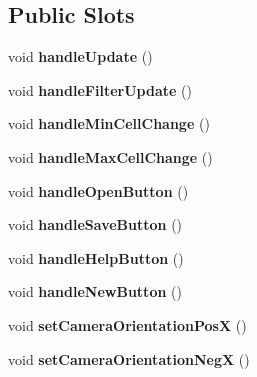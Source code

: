 \subsection*{Public Slots}
\begin{DoxyCompactItemize}
\item 
void {\bfseries handle\+Update} ()\hypertarget{class_main_window_a5c6cea005b60afcc4e0555e40e280e1d}{}\label{class_main_window_a5c6cea005b60afcc4e0555e40e280e1d}

\item 
void {\bfseries handle\+Filter\+Update} ()\hypertarget{class_main_window_a299cb4a0a6e55de646b6439e4c296174}{}\label{class_main_window_a299cb4a0a6e55de646b6439e4c296174}

\item 
void {\bfseries handle\+Min\+Cell\+Change} ()\hypertarget{class_main_window_a5377594fb7fa7112399225602bd7d116}{}\label{class_main_window_a5377594fb7fa7112399225602bd7d116}

\item 
void {\bfseries handle\+Max\+Cell\+Change} ()\hypertarget{class_main_window_a118309e7783cfc818bd93c883f4e8e89}{}\label{class_main_window_a118309e7783cfc818bd93c883f4e8e89}

\item 
void {\bfseries handle\+Open\+Button} ()\hypertarget{class_main_window_a16434089bdb53bc4c867c558c0a7fbb4}{}\label{class_main_window_a16434089bdb53bc4c867c558c0a7fbb4}

\item 
void {\bfseries handle\+Save\+Button} ()\hypertarget{class_main_window_ac52b63ed01bbdd8fd4425be619927c8a}{}\label{class_main_window_ac52b63ed01bbdd8fd4425be619927c8a}

\item 
void {\bfseries handle\+Help\+Button} ()\hypertarget{class_main_window_a919e75cfef556ae0b5611d6655734d1a}{}\label{class_main_window_a919e75cfef556ae0b5611d6655734d1a}

\item 
void {\bfseries handle\+New\+Button} ()\hypertarget{class_main_window_ab015df9a44e44eed7dfb685bd2c38295}{}\label{class_main_window_ab015df9a44e44eed7dfb685bd2c38295}

\item 
void {\bfseries set\+Camera\+Orientation\+PosX} ()\hypertarget{class_main_window_a1983dc5e6d5ccdf46e9f7d1a88835d3d}{}\label{class_main_window_a1983dc5e6d5ccdf46e9f7d1a88835d3d}

\item 
void {\bfseries set\+Camera\+Orientation\+NegX} ()\hypertarget{class_main_window_a4d572113ca36123c0c7dc765b289b413}{}\label{class_main_window_a4d572113ca36123c0c7dc765b289b413}


\end{DoxyCompactItemize}
